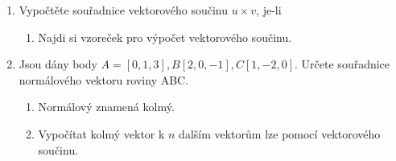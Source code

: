 \documentclass[]{article}
\begin{document}
\begin{enumerate}
\begin{enumerate}
		\end{enumerate}
		\item Vypočtěte souřadnice vektorového součinu $u \times v$, je-li
		\begin{enumerate}
			\item Najdi si vzoreček pro výpočet vektorového součinu.
		\end{enumerate}
		\item Jsou dány body $A=[0,1,3], B[2,0,-1], C[1,-2,0]$. Určete souřadnice normálového vektoru roviny ABC.
		\begin{enumerate}
			\item Normálový znamená kolmý.
			\item Vypočítat kolmý vektor k $n$ dalším vektorům lze pomocí vektorového součinu.
		\end{enumerate}
	\end{enumerate}
\end{document}
